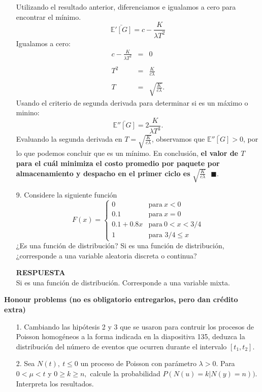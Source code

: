 \documentclass[11pt,letterpaper]{article}
\newcommand{\mE}{\mathbb{E}}
\newcommand{\res}{\textbf{RESPUESTA}\\}
\newcommand{\finf}{\blacksquare.}
\begin{document}
\begin{itemize}
Utilizando el resultado anterior, diferenciamos e igualamos a cero para encontrar el mínimo.
$$\bar{\mE'[G]}=c-\frac{K}{\lambda T^2}$$
Igualamos a cero:
\begin{equation*}
\begin{array}{ccc}
c-\frac{K}{\lambda T^2} &=& 0\\
&&\\
T^2&=&\frac{K}{c\lambda}\\
&&\\
T&=&\sqrt{\frac{K}{c\lambda}}.
\end{array}
\end{equation*}
Usando el criterio de segunda derivada para determinar si es un máximo o minino:
$$\bar{\mE''[G]}=2\frac{K}{\lambda T^3}.$$
Evaluando la segunda derivada en $T=\sqrt{\frac{K}{c\lambda}}$, observamos que $\bar{\mE''[G]}>0$, por lo que podemos concluir que es un mínimo. En conclusión, \textbf{el valor de $T$ para el cuál minimiza el costo promedio por paquete por almacenamiento y despacho en el primer ciclo es} $\sqrt{\frac{K}{c\lambda}}\ \ \ \finf$
\item[9.] Considere la siguiente función
\begin{equation*}
F(x)=\left\{ \begin{array}{cl}
0 & \text{para} \ x<0\\
0.1 & \text{para} \ x=0\\
0.1+0.8x & \text{para} \ 0<x<3/4\\
1 & \text{para } 3/4\leq x
\end{array} \right.
\end{equation*}
¿Es una función de distribución? Si es una función de distribución, ¿corresponde a una variable
aleatoria discreta o continua?

\res 
Si es una función de distribución. Corresponde a una variable mixta.
\end{itemize}


\textbf{Honour problems (no es obligatorio entregarlos, pero dan crédito extra)}\\

\begin{itemize}
\item[1.] Cambiando las hipótesis 2 y 3 que se usaron para contruir los procesos de Poisson homogéneos
a la forma indicada en la diapositiva 135, deduzca la distribución del número de eventos que
ocurren durante el intervalo $[t_1 , t_2]$.

\item[2.] Sea $N(t), \ t\leq 0$ un proceso de Poisson con parámetro $\lambda >0$. Para $0<\mu <t$ y $0\geq k\geq n,$ calcule la probabilidad $P(N(u)=k|N(y)=n)).$ Interpreta los resultados.
\end{itemize}
\end{document}

